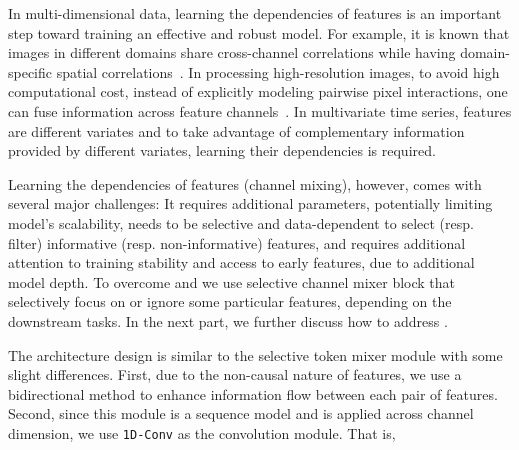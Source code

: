\documentclass{article}
\newcommand{\head}[1]{\vspace{1.7mm}\noindent{{\textcolor{c1}{\bf #1.}}}}
\newcommand*\circled[1]{\tikz[baseline=(char.base)]{
            \node[shape=circle,draw,inner sep=0.3pt, fill=c2] (char) {\textcolor{white}{#1}};}}
\begin{document}
\head{Selective Channel Mixer}
In multi-dimensional data, learning the dependencies of features is an important step toward training an effective and robust model. For example, it is known that images in different domains share cross-channel correlations while having domain-specific spatial correlations~\citep{guo2019depthwise}. In processing high-resolution images, to avoid high computational cost, instead of explicitly modeling pairwise pixel interactions, one can fuse information across feature channels~\citep{zamir2022restormer}. In multivariate time series, features are different variates and to take advantage of complementary information provided by different variates, learning their dependencies is required. 

Learning the dependencies of features (channel mixing), however, comes with several major challenges: It \circled{1} requires additional parameters, potentially limiting model's scalability, \circled{2} needs to be selective and data-dependent to select (resp. filter) informative (resp. non-informative) features, and \circled{3} requires additional attention to training stability and access to early features, due to additional model depth. To overcome \circled{1} and \circled{2} we use selective channel mixer block that selectively focus on or ignore some particular features, depending on the downstream tasks. In the next part, we further discuss how to address \circled{3}.     

The architecture design is similar to the selective token mixer module with some slight differences. First, due to the non-causal nature of features, we use a bidirectional method to enhance information flow between each pair of features. Second, since this module is a sequence model and is applied across channel dimension, we use \texttt{1D-Conv} as the convolution module. That is, 
\end{document}
